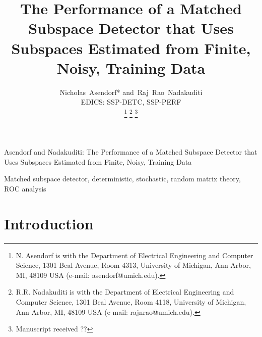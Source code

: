 \documentclass[10pt,twocolumn,twoside]{IEEEtran}
\begin{document}
%
\title{The Performance of a Matched Subspace Detector that Uses Subspaces Estimated from Finite, Noisy, Training Data}


\author{Nicholas~Asendorf*
        and~Raj~Rao~Nadakuditi\\
EDICS: SSP-DETC, SSP-PERF%

\thanks{N. Asendorf is with the Department
of Electrical Engineering and Computer Science, 1301 Beal Avenue, Room 4313, University of Michigan, Ann Arbor,
MI, 48109 USA (e-mail: asendorf@umich.edu).}%
\thanks{R.R. Nadakuditi is with the Department
of Electrical Engineering and Computer Science, 1301 Beal Avenue, Room 4118, University of Michigan, Ann Arbor,
MI, 48109 USA (e-mail: rajnrao@umich.edu).}%
\thanks{Manuscript received ??}}




%
{Asendorf and Nadakuditi: The Performance of a Matched Subspace Detector that Uses Subspaces Estimated from Finite, Noisy, Training Data}
%

\maketitle


\begin{abstract}

\end{abstract}

\begin{IEEEkeywords}
Matched subspace detector, deterministic, stochastic, random matrix theory, ROC analysis
\end{IEEEkeywords}


\IEEEpeerreviewmaketitle

\section{Introduction}\label{sec:intro}

\end{document}
